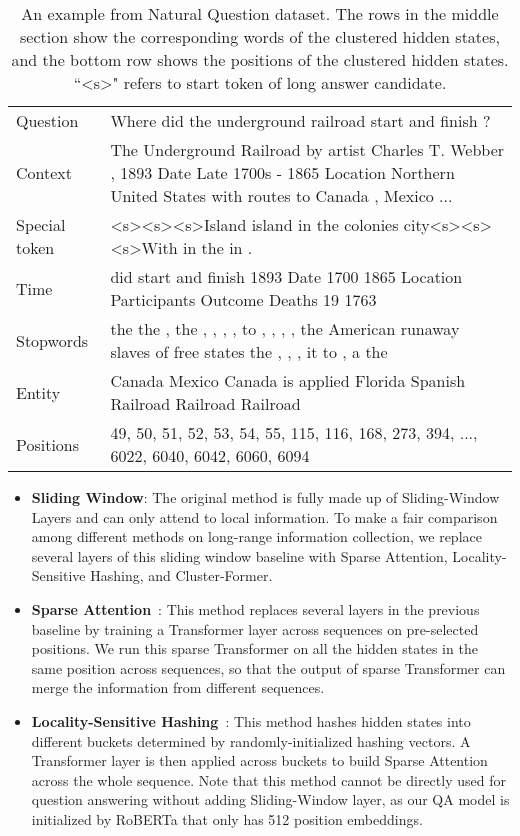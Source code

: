 \begin{table*}[h]
\centering
\begin{tabular}{lp{13cm}}
\toprule
Question         & Where did the underground railroad start and finish ?\\
Context & The Underground Railroad by artist Charles T. Webber , 1893 Date Late 1700s - 1865 Location Northern United States with routes to Canada , Mexico ...\\
\midrule
Special token & \textless{}s\textgreater \textless{}s\textgreater \textless{}s\textgreater Island island in the colonies city\textless{}s\textgreater \textless{}s\textgreater \textless{}s\textgreater With in the in . 
\\
Time & did start and finish 1893 Date 1700 1865 Location Participants Outcome Deaths 19 1763  
\\
Stopwords & the the , the , , , , to , , , , the American runaway slaves of free states the , , , it to , a the 
\\
Entity & Canada Mexico Canada is applied Florida Spanish Railroad Railroad Railroad \\
\midrule
Positions         &   49, 50, 51, 52, 53, 54, 55, 115, 116, 168, 273, 394, ..., 
6022, 6040, 6042, 6060, 6094\\
\bottomrule
\end{tabular}
\caption{An example from Natural Question dataset. The rows in the middle section show the corresponding words of the clustered hidden states, and the bottom row shows the positions of the clustered hidden states. ``\textless{}s\textgreater"  refers to start token of long answer candidate.}
\label{tbl:cluster}
\end{table*}
\begin{itemize}\item
\textbf{Sliding Window}: The original method is fully made up of Sliding-Window Layers and can only attend to local information.
To make a fair comparison among different methods on long-range information collection, we replace several layers of this sliding window baseline with Sparse Attention, Locality-Sensitive Hashing, and Cluster-Former. 
\item
\textbf{Sparse Attention}~\citep{sparsetransf}: This method replaces several layers in the previous baseline by training a Transformer layer across sequences on pre-selected positions. We run this sparse Transformer on all the hidden states in the same position across sequences, so that the output of sparse Transformer can merge the information from different sequences.
\item
\textbf{Locality-Sensitive Hashing}~\citep{reformer}:  This method hashes hidden states into different buckets determined by randomly-initialized hashing vectors.
A Transformer layer is then applied across buckets to build Sparse Attention across the whole sequence.
Note that this method cannot be directly used for question answering without adding Sliding-Window layer, as our QA model is initialized by RoBERTa that only has 512 position embeddings.
\end{itemize}



